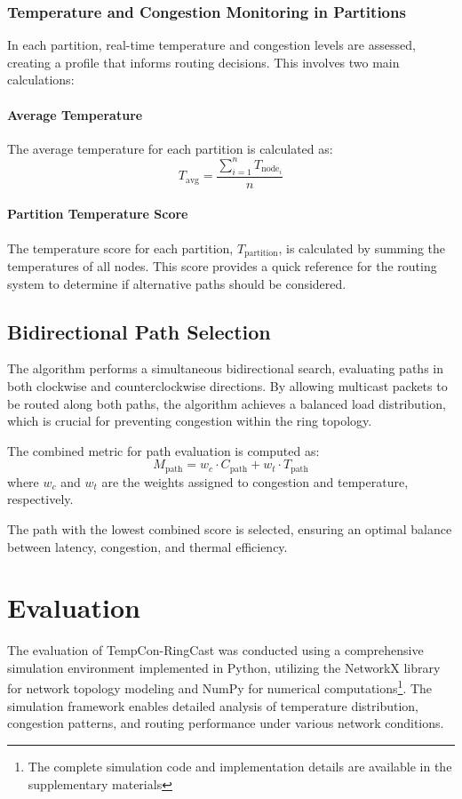 \documentclass[conference]{IEEEtran}
\begin{document}
\subsubsection{Temperature and Congestion Monitoring in Partitions}
In each partition, real-time temperature and congestion levels are assessed, creating a profile that informs routing decisions. This involves two main calculations:

\paragraph{Average Temperature}
The average temperature for each partition is calculated as:
\begin{equation}
T_{\text{avg}} = \frac{\sum_{i=1}^{n} T_{\text{node}_i}}{n}
\end{equation}

\paragraph{Partition Temperature Score}
The temperature score for each partition, $T_{\text{partition}}$, is calculated by summing the temperatures of all nodes. This score provides a quick reference for the routing system to determine if alternative paths should be considered.

\subsection{Bidirectional Path Selection}
The algorithm performs a simultaneous bidirectional search, evaluating paths in both clockwise and counterclockwise directions. By allowing multicast packets to be routed along both paths, the algorithm achieves a balanced load distribution, which is crucial for preventing congestion within the ring topology.

The combined metric for path evaluation is computed as:
\begin{equation}
M_{\text{path}} = w_c \cdot C_{\text{path}} + w_t \cdot T_{\text{path}}
\end{equation}
where $w_c$ and $w_t$ are the weights assigned to congestion and temperature, respectively.

The path with the lowest combined score is selected, ensuring an optimal balance between latency, congestion, and thermal efficiency.

\section{Evaluation}
The evaluation of TempCon-RingCast was conducted using a comprehensive simulation environment implemented in Python, utilizing the NetworkX library for network topology modeling and NumPy for numerical computations\footnote{The complete simulation code and implementation details are available in the supplementary materials}. The simulation framework enables detailed analysis of temperature distribution, congestion patterns, and routing performance under various network conditions.
\end{document}
